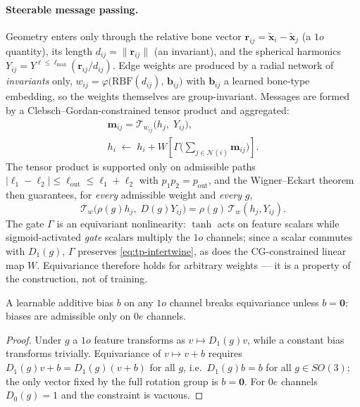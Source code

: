 \paragraph{Steerable message passing.} Geometry enters only through the relative bone vector
$\bm{r}_{ij}=\tilde{\bm{x}}_i-\tilde{\bm{x}}_j$ (a $1o$ quantity), its length $d_{ij}=\|\bm{r}_{ij}\|$
(an invariant), and the spherical harmonics $Y_{ij}=Y^{\ell\le\ell_{\max}}(\bm{r}_{ij}/d_{ij})$. Edge
weights are produced by a radial network of \emph{invariants} only,
$w_{ij}=\varphi\big(\mathrm{RBF}(d_{ij}),\,\bm{b}_{ij}\big)$ with $\bm{b}_{ij}$ a learned bone-type
embedding, so the weights themselves are group-invariant. Messages are formed by a
Clebsch--Gordan-constrained tensor product and aggregated:
%
\begin{equation}
\label{eq:mp}
\begin{gathered}
\bm{m}_{ij}=\mathcal{T}_{w_{ij}}\big(h_j,\;Y_{ij}\big),\\[2pt]
h_i \;\leftarrow\; h_i + W\!\left[\Gamma\Big(\textstyle\sum_{j\in\mathcal{N}(i)}\bm{m}_{ij}\Big)\right].
\end{gathered}
\end{equation}
%
The tensor product is supported only on admissible paths
$|\ell_1-\ell_2|\le\ell_{\text{out}}\le\ell_1+\ell_2$ with $p_1p_2=p_{\text{out}}$, and the
Wigner--Eckart theorem then guarantees, for \emph{every} admissible weight and \emph{every} $g$,
%
\begin{equation}
\label{eq:tp-intertwine}
\mathcal{T}_{w}\big(\rho(g)h_j,\;D(g)Y_{ij}\big)=\rho(g)\,\mathcal{T}_{w}(h_j,Y_{ij}).
\end{equation}
%
The gate $\Gamma$ is an equivariant nonlinearity: $\tanh$ acts on feature scalars while
sigmoid-activated \emph{gate} scalars multiply the $1o$ channels; since a scalar commutes with
$D_1(g)$, $\Gamma$ preserves \eqref{eq:tp-intertwine}, as does the CG-constrained linear map $W$.
Equivariance therefore holds for arbitrary weights --- it is a property of the construction, not of
training.

\begin{proposition}
\label{prop:bias}
A learnable additive bias $b$ on any $1o$ channel breaks equivariance unless $b=\bm{0}$; biases are
admissible only on $0e$ channels.
\end{proposition}
\begin{proof}
Under $g$ a $1o$ feature transforms as $v\mapsto D_1(g)v$, while a constant bias transforms trivially.
Equivariance of $v\mapsto v+b$ requires $D_1(g)v+b=D_1(g)(v+b)$ for all $g$, i.e.\ $D_1(g)b=b$ for all
$g\in SO(3)$; the only vector fixed by the full rotation group is $b=\bm{0}$. For $0e$ channels
$D_0(g)=1$ and the constraint is vacuous.
\end{proof}

